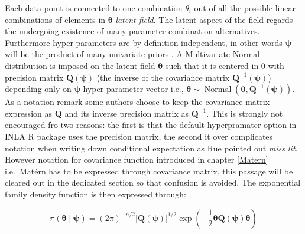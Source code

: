 \documentclass[
  12pt,
  a4paper,
  oneside]{book}
\begin{document}
Each data point is connected to one combination \(\theta_{i}\) out of all the possible linear combinations of elements in \(\boldsymbol{\theta}\) \emph{latent field}. The latent aspect of the field regards the undergoing existence of many parameter combination alternatives. Furthermore hyper parameters are by definition independent, in other words \(\boldsymbol{\psi}\) will be the product of many univariate priors \citep{Bayesian_INLA_Rubio}. A Multivariate Normal distribution is imposed on the latent field \(\boldsymbol{\theta}\) such that it is centered in 0 with precision matrix \(\boldsymbol{Q(\psi)}\) (the inverse of the covariance matrix \(\boldsymbol{Q}^{-1}(\boldsymbol{\psi})\)) depending only on \(\boldsymbol{\psi}\) hyper parameter vector i.e., \(\boldsymbol{\theta} \sim \operatorname{Normal}\left(\mathbf{0}, \boldsymbol{Q}^{-1}(\boldsymbol{\psi})\right)\). As a notation remark some authors choose to keep the covariance matrix expression as \(\boldsymbol{Q}\) and its inverse precision matrix as \(\boldsymbol{Q}^{-1}\). This is strongly not encouraged fro two reasons: the first is that the default hyperpramater option in INLA R package uses the precision matrix, the second it over complicates notation when writing down conditional expectation as Rue pointed out \emph{miss lit}. However notation for covariance function introduced in chapter \ref{Matern} i.e.~Matérn has to be expressed through covariance matrix, this passage will be cleared out in the dedicated section so that confusion is avoided.
The exponential family density function is then expressed through:

\begin{equation}
\pi(\boldsymbol{\theta} \mid \boldsymbol{\psi})=(2 \pi)^{-n / 2}| \boldsymbol{Q(\psi)}|^{1 / 2} \exp \left(-\frac{1}{2} \boldsymbol{\theta} \boldsymbol{Q(\psi)} \boldsymbol{\theta}\right)
\label{eq:gmrf}
\end{equation}
\end{document}

